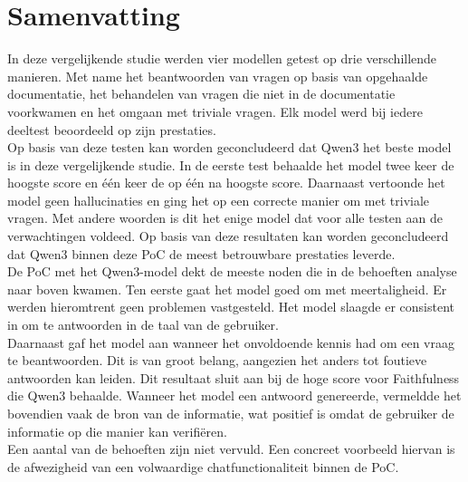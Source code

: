 \section{Samenvatting}
In deze vergelijkende studie werden vier modellen getest op drie verschillende manieren. Met name het beantwoorden van vragen op basis van opgehaalde documentatie, het behandelen van vragen die niet in de documentatie voorkwamen en het omgaan met triviale vragen. Elk model werd bij iedere deeltest beoordeeld op zijn prestaties.
\\[1em]
Op basis van deze testen kan worden geconcludeerd dat Qwen3 het beste model is in deze vergelijkende studie. In de eerste test behaalde het model twee keer de hoogste score en één keer de op één na hoogste score. Daarnaast vertoonde het model geen hallucinaties en ging het op een correcte manier om met triviale vragen. Met andere woorden is dit het enige model dat voor alle testen aan de verwachtingen voldeed. Op basis van deze resultaten kan worden geconcludeerd dat Qwen3 binnen deze PoC de meest betrouwbare prestaties leverde.
\\[1em]
De PoC met het Qwen3-model dekt de meeste noden die in de behoeften analyse naar boven kwamen. Ten eerste gaat het model goed om met meertaligheid. Er werden hieromtrent geen problemen vastgesteld. Het model slaagde er consistent in om te antwoorden in de taal van de gebruiker. 
\\[1em]
Daarnaast gaf het model aan wanneer het onvoldoende kennis had om een vraag te beantwoorden. Dit is van groot belang, aangezien het anders tot foutieve antwoorden kan leiden. Dit resultaat sluit aan bij de hoge score voor Faithfulness die Qwen3 behaalde. Wanneer het model een antwoord genereerde, vermeldde het bovendien vaak de bron van de informatie, wat positief is omdat de gebruiker de informatie op die manier kan verifiëren.  
\\[1em] 
Een aantal van de behoeften zijn niet vervuld. Een concreet voorbeeld hiervan is de afwezigheid van een volwaardige chatfunctionaliteit binnen de PoC.